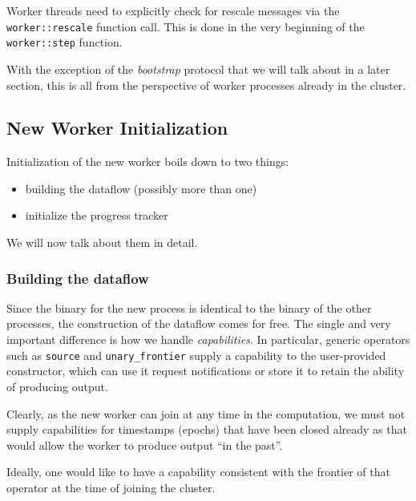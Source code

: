 \documentclass[12pt]{extarticle}
\begin{document}
Worker threads need to explicitly check for rescale messages via the \verb|worker::rescale| function call.
This is done in the very beginning of the \verb|worker::step| function.

With the exception of the \textit{bootstrap} protocol that we will talk about in a later section,
this is all from the perspective of worker processes already in the cluster.

\subsection{New Worker Initialization}

Initialization of the new worker boils down to two things:
\begin{itemize}
    \item building the dataflow (possibly more than one)
    \item initialize the progress tracker
\end{itemize}

We will now talk about them in detail.

\subsubsection{Building the dataflow}
Since the binary for the new process is identical to the binary of the other processes,
the construction of the dataflow comes for free.
The single and very important difference is how we handle \textit{capabilities}.
In particular, generic operators such as \verb|source| and \verb|unary_frontier| supply
a capability to the user-provided constructor, which can use it request notifications
or store it to retain the ability of producing output.

Clearly, as the new worker can join at any time in the computation, we must not supply
capabilities for timestamps (epochs) that have been closed already as that would allow
the worker to produce output ``in the past''.

Ideally, one would like to have a capability consistent with the frontier
of that operator at the time of joining the cluster.

\end{document}
